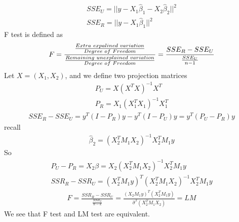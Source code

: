 \documentclass[a4paper]{article}
\begin{document}
\begin{align*}
SSE_U = ||y -X_1\hat\beta_1 - X_2\hat\beta_2||^2\\
SSE_R = ||y -X_1\hat\beta_1 ||^2
\end{align*}
F test is defined as
\begin{align*}
F = \frac{\frac{Extra \hspace{1mm} expalined \hspace{1mm} variation}{Degree \hspace{1mm} of \hspace{1mm} Freedom}}{\frac{Remaining \hspace{1mm}  unexplained \hspace{1mm} variation}{Degree \hspace{1mm} of \hspace{1mm} Freedom}} = \frac{SSE_R - SSE_U}{\frac{SSE_U}{n-1}}
\end{align*}
Let $X=(X_1, X_2)$, and we define two projection matrices
\begin{align*}
P_U = X(X^TX)^{-1}X^T\\
P_R = X_1(X_1^TX_1)^{-1}X_1^T
\end{align*}
\begin{align*}
SSE_R-SSE_U=y^T(I-P_R)y-y^T(I-P_U)y = y^T(P_U-P_R)y
\end{align*}
recall
\begin{align*}
\hat \beta_2 = (X_2^T M_1 X_2)^{-1}X_2^TM_1 y
\end{align*}
So 
\begin{align*}
P_U-P_R = X_2\beta =X_2(X_2^TM_1X_2)^{-1}X_2^TM_1y\\
SSR_R-SSR_U = (X_2^TM_1y)^T(X_2^TM_1X_2)^{-1}X_2^TM_1y
\end{align*}
\begin{align*}
F = \frac{SSR_R - SSR_U}{\frac{SSR_U}{n-k}} = \frac{(X_2M_1y)^T(X_2^TM_1y)}{\hat \sigma^2 (X_2^TM_1X_2)} =LM
\end{align*}
We see that F test and LM test are equivalent.
\end{document}
